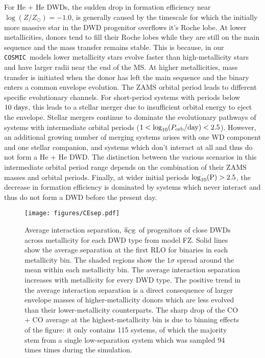 \documentclass[twocolumn, linenumbers]{aastex631}
\newcommand{\cosmic}{\texttt{COSMIC}}
\begin{document}
For He + He DWDs, the sudden drop in formation efficiency near $\log(Z/Z_{\odot})=-1.0$, is generally caused by the timescale for which the initially more massive star in the DWD progenitor overflows it's Roche lobe. At lower metallicities, donors tend to fill their Roche lobes while they are still on the main sequence and the mass transfer remains stable. This is because, in our \cosmic\ models lower metallicity stars evolve faster than high-metallicity stars and have larger radii near the end of the MS. At higher metallicities, mass transfer is initiated when the donor has left the main sequence and the binary enters a common envelope evolution. The ZAMS orbital period leads to different specific evolutionary channels. For short-period systems with periods below $10~\rm{days}$, this leads to a stellar merger due to insufficient orbital energy to eject the envelope. Stellar mergers continue to dominate the evolutionary pathways of systems with intermediate orbital periods ($1 < \log_{10}(P_{\rm{orb}}/\rm{day}) < 2.5$). However, an additional growing number of merging systems arises with one WD component and one stellar companion, and systems which don't interact at all and thus do not form a He + He DWD. The distinction between the various scenarios in this intermediate orbital period range depends on the combination of their ZAMS masses and orbital periods. Finally, at wider initial periods $\log_{10}(\rm{P}) > 2.5$, the decrease in formation efficiency is dominated by systems which never interact and thus do not form a DWD before the present day.

\begin{figure*}
	\texttt{[image: figures/CEsep.pdf]}
    \caption{Average interaction separation, $\overline{\mathrm{a}}_{\rm{CE}}$ of progenitors of close DWDs across metallicity for each DWD type from model FZ. Solid lines show the average separation at the first RLO for binaries in each metallicity bin. The shaded regions show the $1\sigma$ spread around the mean within each metallicity bin. The average interaction separation increases with metallicity for every DWD type. The positive trend in the average interaction separation is a direct consequence of larger envelope masses of higher-metallicity donors which are less evolved than their lower-metallicity counterparts. The sharp drop of the CO + CO average at the highest-metallicity bin is due to binning effects of the figure: it only contains 115 systems, of which the majority stem from a single low-separation system which was sampled 94 times times during the simulation.} 
    \label{fig:CEsep}
\end{figure*}
\end{document}

